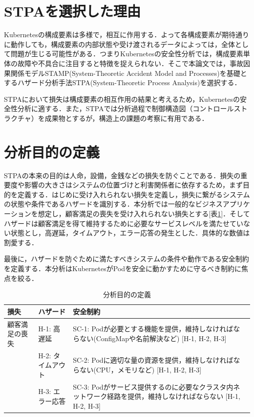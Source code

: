 \documentclass[12pt,a4j]{ujreport}
\begin{document}
\section{STPAを選択した理由}
Kubernetesの構成要素は多様で，相互に作用する．よって各構成要素が期待通りに動作しても，構成要素の内部状態や受け渡されるデータによっては，全体として問題が生じる可能性がある．つまりKubernetesの安全性分析では，構成要素単体の故障や不具合に注目すると特徴を捉えられない．そこで本論文では，事故因果関係モデルSTAMP(System-Theoretic Accident Model and Processes)を基礎とするハザード分析手法STPA(System-Theoretic Process Analysis)\cite{ref26,ref27,ref28}を選択する．

STPAにおいて損失は構成要素の相互作用の結果と考えるため，Kubernetesの安全性分析に適する．また，STPAでは分析過程で制御構造図（コントロールストラクチャ）を成果物とするが，構造上の課題の考察に有用である．

\section{分析目的の定義}
STPAの本来の目的は人命，設備，金銭などの損失を防ぐことである．損失の重要度や影響の大きさはシステムの位置づけと利害関係者に依存するため，まず目的を定義する．はじめに受け入れられない損失を定義し，損失に繋がるシステムの状態や条件であるハザードを識別する．本分析では一般的なビジネスアプリケーションを想定し，顧客満足の喪失を受け入れられない損失とする[表\ref{table1}]．そしてハザードは顧客満足を得て維持するために必要なサービスレベルを満たせていない状態とし，高遅延，タイムアウト，エラー応答の発生とした．具体的な数値は割愛する．

最後に，ハザードを防ぐために満たすべきシステムの条件や動作である安全制約を定義する．本分析はKubernetesがPodを安全に動かすために守るべき制約に焦点を絞る．
\newpage
\begin{table}[t]
    \centering
    \caption{分析目的の定義}\label{table1}
    \begin{tabularx}{\linewidth}{X|X|X}
        損失           & ハザード          & 安全制約                                                                                                      \\ \hline \hline
        顧客満足の喪失 & H-1: 高遅延       & SC-1: Podが必要とする機能を提供，維持しなければならない(ConfigMapや名前解決など) [H-1, H-2, H-3]              \\ \cline{3-3}
                       & H-2: タイムアウト & SC-2: Podに適切な量の資源を提供，維持しなければならない(CPU，メモリなど) [H-1, H-2, H-3]                      \\ \cline{3-3}
                       & H-3: エラー応答   & SC-3: Podがサービス提供するのに必要なクラスタ内ネットワーク経路を提供，維持しなければならない [H-1, H-2, H-3] \\ \hline
    \end{tabularx}
\end{table}
\end{document}
